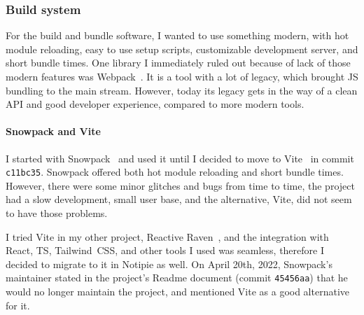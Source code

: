 \subsubsection{Build system}\label{sec:build-system}

For the build and bundle software,
I wanted to use something modern,
with hot module reloading,
easy to use setup scripts,
customizable development server,
and short bundle times.
One library I immediately ruled out
because of lack of those modern features
was Webpack~\cite{koppers_webpack_2022}.
It is a tool with a lot of legacy,
which brought \ac{JS} bundling to the main stream.
However, today its legacy gets in the way
of a clean \ac{API} and good developer experience,
compared to more modern tools.

\paragraph*{Snowpack and Vite}\label{sec:snowpack-and-vite}

I started with Snowpack~\cite{schott_snowpack_2021}
and used it until I decided to move to Vite~\cite{you_vite_2022}
in commit \texttt{c11bc35}.
Snowpack offered both hot module reloading and short bundle times.
However, there were some minor glitches and bugs from time to time,
the project had a slow development,
small user base,
and the alternative, Vite,
did not seem to have those problems.

I tried Vite in my other project,
Reactive Raven~\cite{sewera_reactive_2022},
and the integration with
React,
\ac{TS},
Tailwind~CSS,
and other tools I used was seamless,
therefore I decided to migrate to it in Notipie as well.
On April 20th, 2022,
Snowpack's maintainer stated in the project's Readme document
(commit \texttt{45456aa})
that he would no longer maintain the project,
and mentioned Vite as a good alternative for it.

